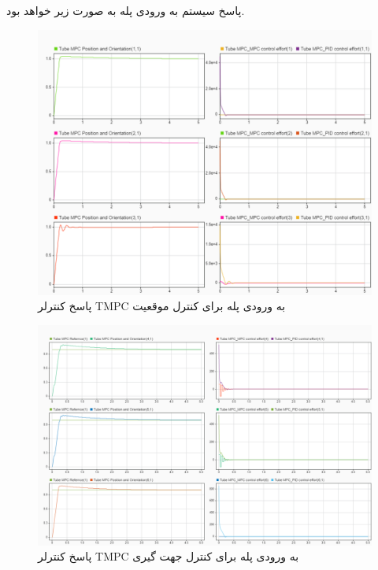 پاسخ سیستم به ورودی پله به صورت زیر خواهد بود.
\begin{figure}[H]
	\centering
	\includegraphics[width=1\linewidth]{../img/TMPC_Response_Position}
	\caption{پاسخ کنترلر TMPC به ورودی پله برای کنترل موقعیت}
	\label{fig:tmpcresponseposition}
\end{figure}
\begin{figure}[H]
	\centering
	\includegraphics[width=1\linewidth]{../img/TMPC_Response_Orientation}
	\caption{پاسخ کنترلر TMPC به ورودی پله برای کنترل جهت گیری}
	\label{fig:tmpcresponseorientation}
\end{figure}

